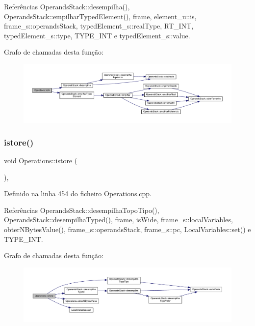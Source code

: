 Referências Operands\+Stack\+::desempilha(), Operands\+Stack\+::empilhar\+Typed\+Element(), frame, element\+\_\+u\+::is, frame\+\_\+s\+::operands\+Stack, typed\+Element\+\_\+s\+::real\+Type, R\+T\+\_\+\+I\+NT, typed\+Element\+\_\+s\+::type, T\+Y\+P\+E\+\_\+\+I\+NT e typed\+Element\+\_\+s\+::value.

Grafo de chamadas desta função\+:
\nopagebreak
\begin{figure}[H]
\begin{center}
\leavevmode
\includegraphics[width=350pt]{classOperations_aa67d92582121939b307658d417b34d3c_cgraph}
\end{center}
\end{figure}
\mbox{\label{classOperations_a1547cbd0fa84e551f218d472a5187efa}} 
\subsubsection{\texorpdfstring{istore()}{istore()}}
{\footnotesize\ttfamily void Operations\+::istore (\begin{DoxyParamCaption}{ }\end{DoxyParamCaption})\hspace{0.3cm}{\ttfamily [static]}, {\ttfamily [private]}}



Definido na linha 454 do ficheiro Operations.\+cpp.



Referências Operands\+Stack\+::desempilha\+Topo\+Tipo(), Operands\+Stack\+::desempilha\+Typed(), frame, is\+Wide, frame\+\_\+s\+::local\+Variables, obter\+N\+Bytes\+Value(), frame\+\_\+s\+::operands\+Stack, frame\+\_\+s\+::pc, Local\+Variables\+::set() e T\+Y\+P\+E\+\_\+\+I\+NT.

Grafo de chamadas desta função\+:
\nopagebreak
\begin{figure}[H]
\begin{center}
\leavevmode
\includegraphics[width=350pt]{classOperations_a1547cbd0fa84e551f218d472a5187efa_cgraph}
\end{center}
\end{figure}
\mbox{\label{classOperations_ae0a17c510b570467f5b025e3dcbe1398}} 

